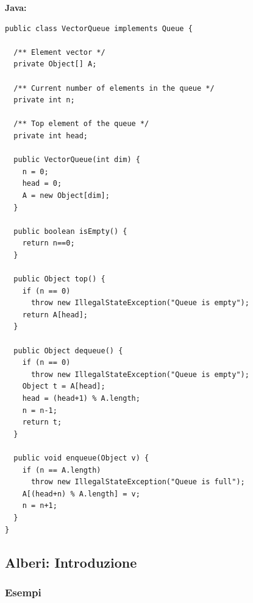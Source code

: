 \documentclass[12pt, a4paper]{article}
\begin{document}
\textbf{Java:}
\begin{verbatim}
public class VectorQueue implements Queue {

  /** Element vector */
  private Object[] A;

  /** Current number of elements in the queue */
  private int n;

  /** Top element of the queue */
  private int head;

  public VectorQueue(int dim) {
    n = 0;
    head = 0;
    A = new Object[dim];
  }

  public boolean isEmpty() {
    return n==0;
  }

  public Object top() {
    if (n == 0)
      throw new IllegalStateException("Queue is empty");
    return A[head];
  }

  public Object dequeue() {
    if (n == 0)
      throw new IllegalStateException("Queue is empty");
    Object t = A[head];
    head = (head+1) % A.length;
    n = n-1;
    return t;
  }

  public void enqueue(Object v) {
    if (n == A.length)
      throw new IllegalStateException("Queue is full");
    A[(head+n) % A.length] = v;
    n = n+1;
  }
}
\end{verbatim}



\subsection{Alberi: Introduzione}
\label{sec:alberi-introduzione}

\subsubsection{Esempi}
\end{document}
